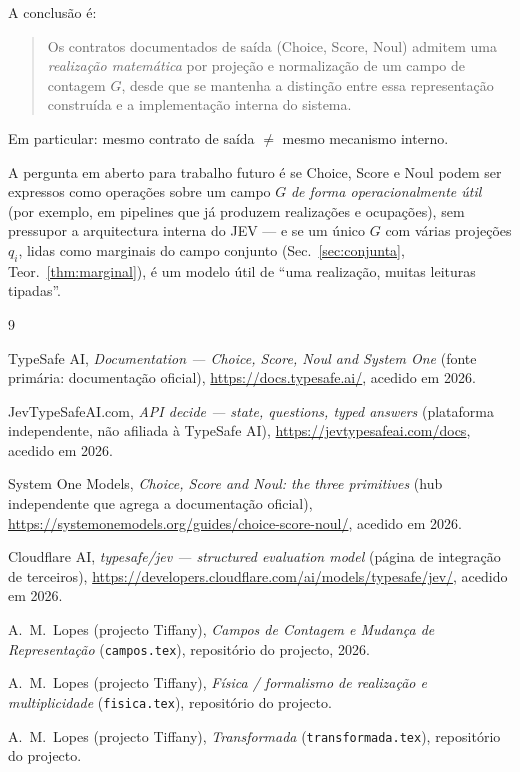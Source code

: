 \documentclass[11pt,a4paper]{article}
\begin{document}
A conclusão é:
\begin{quote}
Os contratos documentados de saída (Choice, Score, Noul) admitem uma
\emph{realização matemática} por projeção e normalização de um campo de
contagem \(G\), desde que se mantenha a distinção entre essa representação
construída e a implementação interna do sistema.
\end{quote}

Em particular: mesmo contrato de saída \(\neq\) mesmo mecanismo interno.

A pergunta em aberto para trabalho futuro é se Choice, Score e Noul podem ser
expressos como operações sobre um campo \(G\) \emph{de forma operacionalmente
útil} (por exemplo, em pipelines que já produzem realizações e ocupações),
sem pressupor a arquitectura interna do JEV --- e se um único \(G\) com
várias projeções \(q_i\), lidas como marginais do campo conjunto
(Sec.~\ref{sec:conjunta}, Teor.~\ref{thm:marginal}), é um modelo útil de
``uma realização, muitas leituras tipadas''.

\begin{thebibliography}{9}

TypeSafe AI,
\emph{Documentation --- Choice, Score, Noul and System One}
(fonte primária: documentação oficial),
\url{https://docs.typesafe.ai/},
acedido em 2026.

JevTypeSafeAI.com,
\emph{API decide --- state, questions, typed answers}
(plataforma independente, não afiliada à TypeSafe AI),
\url{https://jevtypesafeai.com/docs},
acedido em 2026.

System One Models,
\emph{Choice, Score and Noul: the three primitives}
(hub independente que agrega a documentação oficial),
\url{https://systemonemodels.org/guides/choice-score-noul/},
acedido em 2026.

Cloudflare AI,
\emph{typesafe/jev --- structured evaluation model}
(página de integração de terceiros),
\url{https://developers.cloudflare.com/ai/models/typesafe/jev/},
acedido em 2026.

A.~M.~Lopes (projecto Tiffany),
\emph{Campos de Contagem e Mudança de Representação}
(\texttt{campos.tex}), repositório do projecto, 2026.

A.~M.~Lopes (projecto Tiffany),
\emph{Física / formalismo de realização e multiplicidade}
(\texttt{fisica.tex}), repositório do projecto.

A.~M.~Lopes (projecto Tiffany),
\emph{Transformada}
(\texttt{transformada.tex}), repositório do projecto.

\end{thebibliography}
\end{document}
